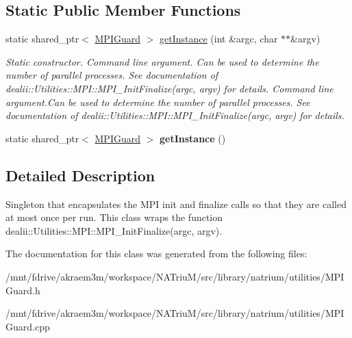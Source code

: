 \subsection*{Static Public Member Functions}
\begin{DoxyCompactItemize}
\item 
\hypertarget{classnatrium_1_1MPIGuard_a2633a4f3fdd0fb9959dc91ffca5f5232}{
static shared\_\-ptr$<$ \hyperlink{classnatrium_1_1MPIGuard}{MPIGuard} $>$ \hyperlink{classnatrium_1_1MPIGuard_a2633a4f3fdd0fb9959dc91ffca5f5232}{getInstance} (int \&argc, char $\ast$$\ast$\&argv)}
\label{classnatrium_1_1MPIGuard_a2633a4f3fdd0fb9959dc91ffca5f5232}

\begin{DoxyCompactList}\small\item\em Static constructor.  Command line argument. Can be used to determine the number of parallel processes. See documentation of dealii::Utilities::MPI::MPI\_\-InitFinalize(argc, argv) for details.  Command line argument.Can be used to determine the number of parallel processes. See documentation of dealii::Utilities::MPI::MPI\_\-InitFinalize(argc, argv) for details. \item\end{DoxyCompactList}\item 
\hypertarget{classnatrium_1_1MPIGuard_ab6593f7b33cd94f32dd4c6afa1dae6fc}{
static shared\_\-ptr$<$ \hyperlink{classnatrium_1_1MPIGuard}{MPIGuard} $>$ {\bfseries getInstance} ()}
\label{classnatrium_1_1MPIGuard_ab6593f7b33cd94f32dd4c6afa1dae6fc}

\end{DoxyCompactItemize}


\subsection{Detailed Description}
Singleton that encapsulates the MPI init and finalize calls so that they are called at most once per run. This class wraps the function dealii::Utilities::MPI::MPI\_\-InitFinalize(argc, argv). 

The documentation for this class was generated from the following files:\begin{DoxyCompactItemize}
\item 
/mnt/fdrive/akraem3m/workspace/NATriuM/src/library/natrium/utilities/MPIGuard.h\item 
/mnt/fdrive/akraem3m/workspace/NATriuM/src/library/natrium/utilities/MPIGuard.cpp\end{DoxyCompactItemize}
